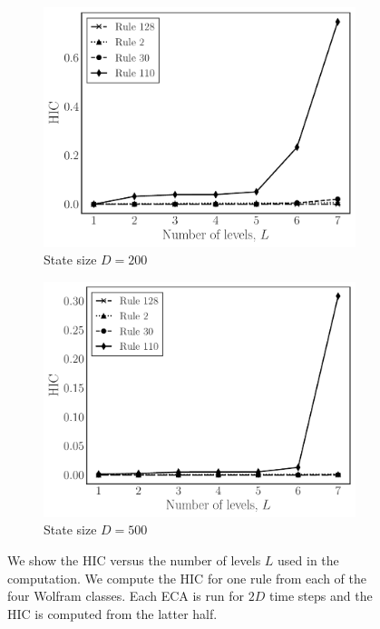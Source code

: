 \begin{figure}[t]
\centering
\begin{subfigure}{0.45\textwidth}
  \includegraphics[width=1.0\textwidth]{figures/hic_vs_num_levels_size_200}
  \caption{State size $D = 200$}
  \label{fig:hic_levels_200}
\end{subfigure}
\begin{subfigure}{0.45\textwidth}
  \includegraphics[width=1.0\textwidth]{figures/hic_vs_num_levels_size_500}
  \caption{State size $D = 500$}
  \label{fig:hic_levels_500}
\end{subfigure}
\caption{We show the HIC versus the number of levels $L$ used in the
    computation. We compute the HIC for one rule from each of the four Wolfram
    classes. Each ECA is run for $2D$ time steps and the HIC is computed from
    the latter half.}
\label{fig:hic_vs_levels}
\end{figure}

